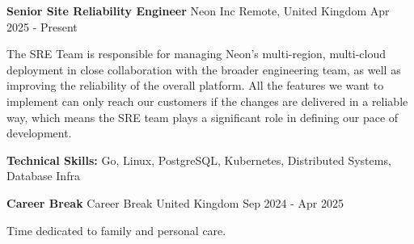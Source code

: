 

\begin{cventries}

	\cventry
	{\textbf{Senior Site Reliability Engineer}} %
	{Neon Inc} %
	{Remote, United Kingdom} %
	{Apr 2025 - Present} %
	{
		\begin{cvitems} %
			\item {The SRE Team is responsible for managing Neon’s multi-region, multi-cloud deployment in close
			            collaboration with the broader engineering team, as well as improving the reliability of the overall
			            platform. All the features we want to implement can only reach our customers if the changes are
			            delivered in a reliable way, which means the SRE team plays a significant role in defining our pace of
			            development.}
			\item {\textbf{Technical Skills:} Go, Linux, PostgreSQL, Kubernetes, Distributed Systems, Database Infra}
		\end{cvitems}
	}

	\cventry
	{\textbf{Career Break}} %
	{Career Break} %
	{United Kingdom} %
	{Sep 2024 - Apr 2025} %
	{
		\begin{cvitems} %
			\item {Time dedicated to family and personal care.}
		\end{cvitems}
	}


\end{cventries}
